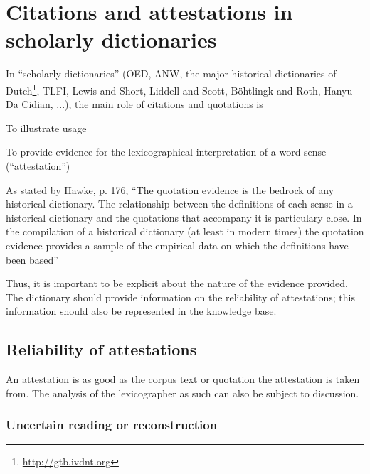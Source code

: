 \documentclass[10pt]{article}
\let\tempeone\enumerate
\let\tempetwo\endenumerate
\renewenvironment{enumerate}{\tempeone\setlength\itemsep{-0.5pt}\setlength{\partopsep}{-0.5pt}\setlength{\parsep}{-0.5pt}\setlength{\topsep}{-0.5pt}}{\tempetwo}
\begin{document}
\section{Citations and attestations in scholarly dictionaries}

In ``scholarly dictionaries'' (OED, ANW, the major historical dictionaries of Dutch\footnote{\url{http://gtb.ivdnt.org}}, TLFI, Lewis and Short, Liddell and Scott, Böhtlingk and Roth, Hanyu Da Cidian, ...), the main role of citations and quotations is 
\begin{enumerate}
    \item To illustrate usage
    \item To provide evidence for the lexicographical interpretation of a word sense (``attestation'')
\end{enumerate}

As stated by Hawke, \cite{Hawke} p. 176, ``The quotation evidence is the bedrock of any historical dictionary. The relationship between the definitions of each sense in a historical dictionary and the quotations that accompany it is particulary close. In the compilation of a historical dictionary (at least in modern times) the quotation evidence provides a sample of the empirical data on which the definitions have been based''

Thus, it is important to be explicit about the nature of the evidence provided. The dictionary should provide information on the reliability of attestations; this information should also be represented in the knowledge base. 

\subsection{Reliability of attestations}



 An attestation is as good as the corpus text or quotation the attestation is taken from. The analysis of the lexicographer as such can also be subject to discussion.\par

\subsubsection*{Uncertain reading or reconstruction}
\end{document}
